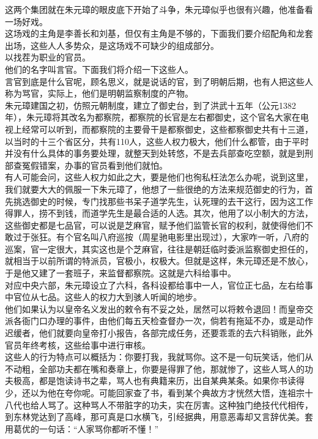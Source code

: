 \begin{multicols}{\theparacolNo}
这两个集团就在朱元璋的眼皮底下开始了斗争，朱元璋似乎也很有兴趣，他准备看一场好戏。\\

这场戏的主角是李善长和刘基，但仅有主角是不够的，下面我们要介绍配角和龙套出场，这些人人多势众，是这场戏不可缺少的组成部分。\\

以找茬为职业的官员。\\

他们的名字叫言官。下面我们将介绍一下这些人。\\

言官到底是什么官呢，顾名思义，就是说话的官，到了明朝后期，也有人把这些人称为骂官，实际上，他们是明朝监察制度的产物。\\

朱元璋建国之初，仿照元朝制度，建立了御史台，到了洪武十五年（公元1382年），朱元璋将其改名为都察院，都察院的长官是左右都御史，这个官名大家在电视上经常可以听到，而都察院的主要骨干是都察御史，这些都察御史共有十三道，以当时的十三个省区分，共有110人，这些人权力极大，他们什么都管，由于平时并没有什么具体的事务要处理，就整天到处转悠，不是去兵部查吃空额，就是到刑部查冤假错案，办事的官员看到他们就怕。\\

有人可能会问，这些人权力如此之大，要是他们也徇私枉法怎么办呢，说到这里，我们就要大大的佩服一下朱元璋了，他想了一些很绝的方法来规范御史的行为，首先挑选御史的时候，专门找那些书呆子道学先生，认死理的去干这行，因为这工作得罪人，捞不到钱，而道学先生是最合适的人选。其次，他用了以小制大的方法，这些御史都是七品官，可以说是芝麻官，赋予他们监管长官的权利，就使得他们不敢过于张狂。有个官名叫八府巡按（周星驰电影里出现过），大家咋一听，八府的巡案，官一定很大，其实这也是个芝麻官，往往是朝廷临时委派监察御史担任的，就相当于以前所谓的特派员，官极小，权极大。但就是这样，朱元璋还是不放心，于是他又建了一套班子，来监督都察院。这就是六科给事中。\\

对应中央六部，朱元璋设立了六科，各科设都给事中一人，官位正七品，左右给事中官位从七品。这些人的权力大到骇人听闻的地步。\\

他们如果认为以皇帝名义发出的敕令有不妥之处，居然可以将敕令退回！而皇帝交派各衙门口办理的事件，由他们每五天检查督办一次，倘若有拖延不办，或是动作迟缓者，他们就要向皇帝打小报告，各部完成任务，还要乖乖的去六科销账，此外官员年终考核，这些给事中进行审核。\\

这些人的行为特点可以概括为：你要打我，我就骂你。这不是一句玩笑话，他们从不动粗，全部功夫都在嘴和奏章上，你要是得罪了他，那就惨了，这些人骂人的功夫极高，都是饱读诗书之辈，骂人也有典籍来历，出自某典某条。如果你书读得少，还以为他在夸你呢。可能回家查了书，看到某个典故方才恍然大悟，连祖宗十八代也给人骂了。这种骂人不带脏字的功夫，实在厉害。这种独门绝技代代相传，到东林党达到了高峰，那可真是口水横飞，引经据典，用意恶毒却又言辞优美。套用葛优的一句话：“人家骂你都听不懂！”\\


\end{multicols}
